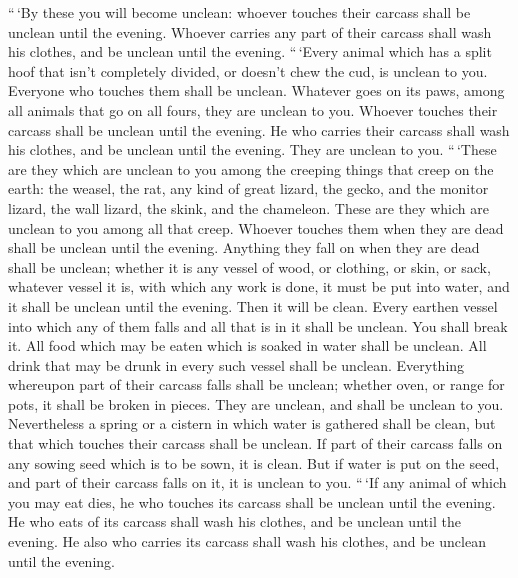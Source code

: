  ``\,`By these you will become unclean: whoever touches
their carcass shall be unclean until the evening. 
Whoever carries any part of their carcass shall wash his clothes, and be
unclean until the evening.  ``\,`Every animal which has a
split hoof that isn't completely divided, or doesn't chew the cud, is
unclean to you. Everyone who touches them shall be unclean.
 Whatever goes on its paws, among all animals that go on
all fours, they are unclean to you. Whoever touches their carcass shall
be unclean until the evening.  He who carries their
carcass shall wash his clothes, and be unclean until the evening. They
are unclean to you.  ``\,`These are they which are
unclean to you among the creeping things that creep on the earth: the
weasel, the rat, any kind of great lizard,  the gecko,
and the monitor lizard, the wall lizard, the skink, and the chameleon.
 These are they which are unclean to you among all that
creep. Whoever touches them when they are dead shall be unclean until
the evening.  Anything they fall on when they are dead
shall be unclean; whether it is any vessel of wood, or clothing, or
skin, or sack, whatever vessel it is, with which any work is done, it
must be put into water, and it shall be unclean until the evening. Then
it will be clean.  Every earthen vessel into which any of
them falls and all that is in it shall be unclean. You shall break it.
 All food which may be eaten which is soaked in water
shall be unclean. All drink that may be drunk in every such vessel shall
be unclean.  Everything whereupon part of their carcass
falls shall be unclean; whether oven, or range for pots, it shall be
broken in pieces. They are unclean, and shall be unclean to you.
 Nevertheless a spring or a cistern in which water is
gathered shall be clean, but that which touches their carcass shall be
unclean.  If part of their carcass falls on any sowing
seed which is to be sown, it is clean.  But if water is
put on the seed, and part of their carcass falls on it, it is unclean to
you.  ``\,`If any animal of which you may eat dies, he
who touches its carcass shall be unclean until the evening.
 He who eats of its carcass shall wash his clothes, and
be unclean until the evening. He also who carries its carcass shall wash
his clothes, and be unclean until the evening.

